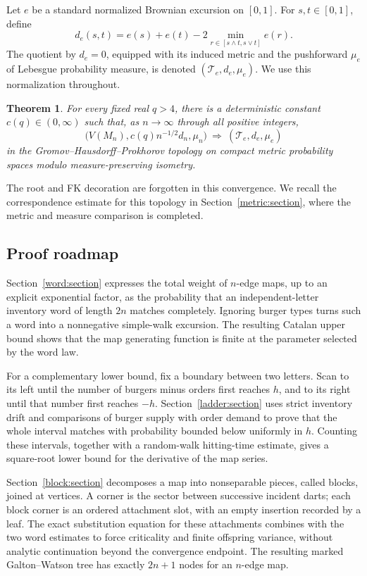 \documentclass[11pt,a4paper]{article}
\numberwithin{equation}{section}
\newtheorem{theorem}{Theorem}[section]
\theoremstyle{definition}
\theoremstyle{remark}
\newcommand{\1}{\mathbf 1}
\begin{document}
Let $e$ be a standard normalized Brownian excursion on $[0,1]$. For
$s,t\in[0,1]$, define
\[
 d_e(s,t)=e(s)+e(t)-
   2\min_{r\in[s\wedge t,s\vee t]}e(r).
\]
The quotient by $d_e=0$, equipped with its induced metric and the
pushforward $\mu_e$ of Lebesgue probability measure, is denoted
$(\mathcal T_e,d_e,\mu_e)$. We use this normalization throughout.

\begin{theorem}\label{thm:main}
For every fixed real $q>4$, there is a deterministic constant
$c(q)\in(0,\infty)$ such that, as $n\to\infty$ through all positive
integers,
\[
 \big(V(M_n),c(q)n^{-1/2}d_n,\mu_n\big)
 \ \Longrightarrow\ (\mathcal T_e,d_e,\mu_e)
\]
in the Gromov--Hausdorff--Prokhorov topology on compact metric probability
spaces modulo measure-preserving isometry.
\end{theorem}

The root and FK decoration are forgotten in this convergence.
We recall the correspondence estimate for this topology in
Section~\ref{metric:section}, where the metric and measure comparison is
completed.



\subsection{Proof roadmap}

Section~\ref{word:section} expresses the total weight of $n$-edge maps,
up to an explicit exponential factor, as the probability that an
independent-letter inventory word of length $2n$ matches completely.
Ignoring burger types turns such a word into a nonnegative simple-walk
excursion. The resulting Catalan upper bound shows that the map
generating function is finite at the parameter selected by the word
law.

For a complementary lower bound, fix a boundary between two letters.
Scan to its left until the number of burgers minus orders first reaches
$h$, and to its right until that number first reaches $-h$.
Section~\ref{ladder:section} uses strict inventory drift and comparisons
of burger supply with order demand to prove that the whole interval
matches with probability bounded below uniformly in $h$.
Counting these intervals, together with a random-walk hitting-time
estimate, gives a square-root lower bound for the derivative of the map
series.

Section~\ref{block:section} decomposes a map into nonseparable pieces,
called blocks, joined at vertices. A corner is the sector between
successive incident darts; each block corner is an ordered attachment
slot, with an empty insertion recorded by a leaf. The exact substitution
equation for these attachments combines with the two word estimates to
force criticality and finite offspring variance, without analytic
continuation beyond the convergence endpoint. The resulting marked
Galton--Watson tree has exactly $2n+1$ nodes for an $n$-edge map.
\end{document}
